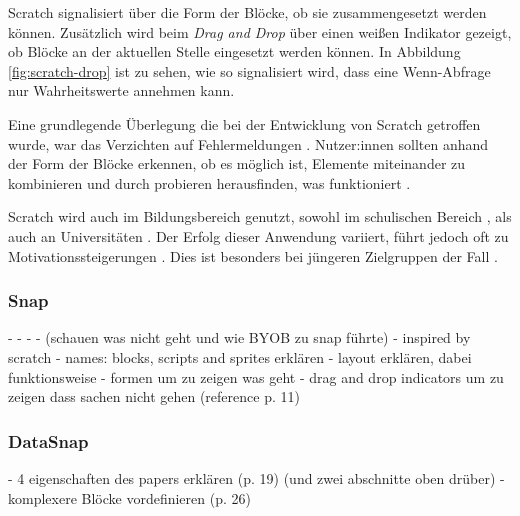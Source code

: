 Scratch signalisiert über die Form der Blöcke, ob sie zusammengesetzt werden können. Zusätzlich wird beim \textit{Drag and Drop} über einen weißen Indikator gezeigt, ob Blöcke an der aktuellen Stelle eingesetzt werden können. In Abbildung \ref{fig:scratch-drop} ist zu sehen, wie so signalisiert wird, dass eine Wenn-Abfrage nur Wahrheitswerte annehmen kann.

Eine grundlegende Überlegung die bei der Entwicklung von Scratch getroffen wurde, war das Verzichten auf Fehlermeldungen \parencite{maloneyScratchProgramming2010}. Nutzer:innen sollten anhand der Form der Blöcke erkennen, ob es möglich ist, Elemente miteinander zu kombinieren und durch probieren herausfinden, was funktioniert \parencite{maloneyScratchProgramming2010}.

Scratch wird auch im Bildungsbereich genutzt, sowohl im schulischen Bereich \parencite{ortiz-colonTeachingScratch2016}, als auch an Universitäten \parencite{dekerekiScratchApplications2008, harveyBringingNo2010, martinez-valdesRelativelyUnsatisfactory2017}. Der Erfolg dieser Anwendung variiert, führt jedoch oft zu Motivationssteigerungen \parencite{dekerekiScratchApplications2008, martinez-valdesRelativelyUnsatisfactory2017}. Dies ist besonders bei jüngeren Zielgruppen der Fall \parencite{ortiz-colonTeachingScratch2016}.

\subsubsection{Snap}
- \parencite{harveySnapBuild}
- \parencite{harveySnapReference2020}
- \parencite{ballSnapLook2019}
- \parencite{harveyBringingNo2010} (schauen was nicht geht und wie BYOB zu snap führte)
- inspired by scratch
- names: blocks, scripts and sprites erklären
- layout erklären, dabei funktionsweise
- formen um zu zeigen was geht
- drag and drop indicators um zu zeigen dass sachen nicht gehen (reference p. 11)


\subsubsection{DataSnap}
- 4 eigenschaften des papers erklären (p. 19) (und zwei abschnitte oben drüber)
- komplexere Blöcke vordefinieren (p. 26)

